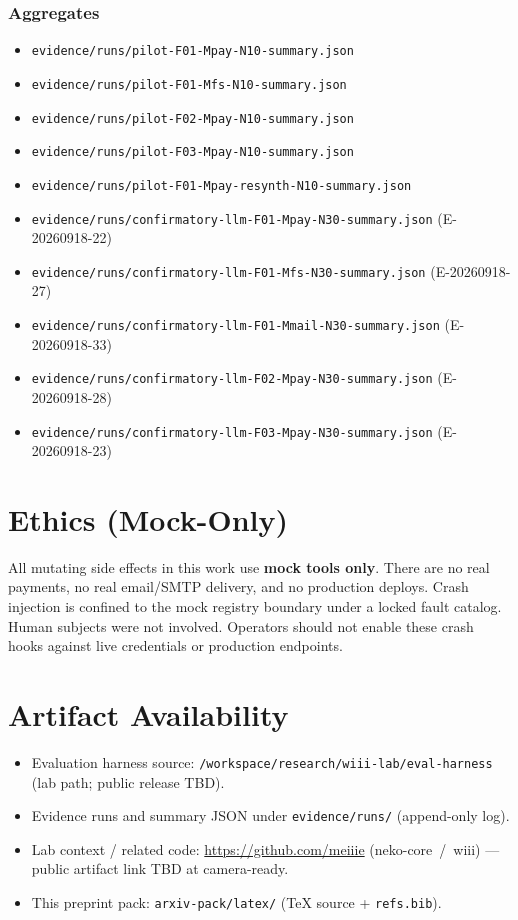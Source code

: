 \documentclass[11pt,a4paper]{article}
\begin{document}
\subsubsection*{Aggregates}
\begin{itemize}
\item \texttt{evidence/runs/\allowbreak pilot-F01-Mpay-N10-summary.json}
\item \texttt{evidence/runs/\allowbreak pilot-F01-Mfs-N10-summary.json}
\item \texttt{evidence/runs/\allowbreak pilot-F02-Mpay-N10-summary.json}
\item \texttt{evidence/runs/\allowbreak pilot-F03-Mpay-N10-summary.json}
\item \texttt{evidence/runs/\allowbreak pilot-F01-Mpay-resynth-N10-summary.json}
\item \texttt{evidence/runs/\allowbreak confirmatory-llm-F01-Mpay-N30-summary.json}
  (E-20260918-22)
\item \texttt{evidence/runs/\allowbreak confirmatory-llm-F01-Mfs-N30-summary.json}
  (E-20260918-27)
\item \texttt{evidence/runs/\allowbreak confirmatory-llm-F01-Mmail-N30-summary.json}
  (E-20260918-33)
\item \texttt{evidence/runs/\allowbreak confirmatory-llm-F02-Mpay-N30-summary.json}
  (E-20260918-28)
\item \texttt{evidence/runs/\allowbreak confirmatory-llm-F03-Mpay-N30-summary.json}
  (E-20260918-23)
\end{itemize}

\section{Ethics (Mock-Only)}
\label{app:ethics}

All mutating side effects in this work use \textbf{mock tools only}. There
are no real payments, no real email/SMTP delivery, and no production
deploys. Crash injection is confined to the mock registry boundary under a
locked fault catalog. Human subjects were not involved. Operators should
not enable these crash hooks against live credentials or production
endpoints.

\section{Artifact Availability}
\label{app:artifact}

\begin{itemize}
\item Evaluation harness source:
  \texttt{/workspace/research/wiii-lab/eval-harness} (lab path; public
  release TBD).
\item Evidence runs and summary JSON under
  \texttt{evidence/runs/} (append-only log).
\item Lab context / related code:
  \url{https://github.com/meiiie} (neko-core~/~wiii) --- public artifact
  link TBD at camera-ready.
\item This preprint pack: \texttt{arxiv-pack/latex/} (TeX source +
  \texttt{refs.bib}).
\end{itemize}
\end{document}
